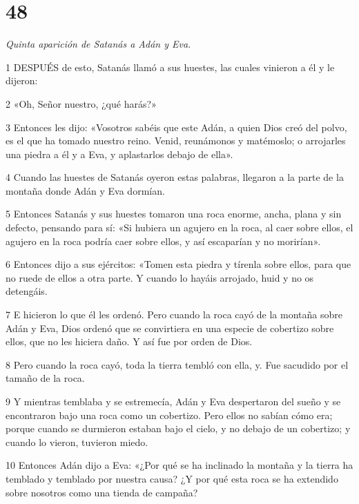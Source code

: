 \chapter{48}

\par \textit{Quinta aparición de Satanás a Adán y Eva.}

\par 1 DESPUÉS de esto, Satanás llamó a sus huestes, las cuales vinieron a él y le dijeron:

\par 2 «Oh, Señor nuestro, ¿qué harás?»

\par 3 Entonces les dijo: «Vosotros sabéis que este Adán, a quien Dios creó del polvo, es el que ha tomado nuestro reino. Venid, reunámonos y matémoslo; o arrojarles una piedra a él y a Eva, y aplastarlos debajo de ella».

\par 4 Cuando las huestes de Satanás oyeron estas palabras, llegaron a la parte de la montaña donde Adán y Eva dormían.

\par 5 Entonces Satanás y sus huestes tomaron una roca enorme, ancha, plana y sin defecto, pensando para sí: «Si hubiera un agujero en la roca, al caer sobre ellos, el agujero en la roca podría caer sobre ellos, y así escaparían y no morirían».

\par 6 Entonces dijo a sus ejércitos: «Tomen esta piedra y tírenla sobre ellos, para que no ruede de ellos a otra parte. Y cuando lo hayáis arrojado, huid y no os detengáis.

\par 7 E hicieron lo que él les ordenó. Pero cuando la roca cayó de la montaña sobre Adán y Eva, Dios ordenó que se convirtiera en una especie de cobertizo sobre ellos, que no les hiciera daño. Y así fue por orden de Dios.

\par 8 Pero cuando la roca cayó, toda la tierra tembló con ella, y. Fue sacudido por el tamaño de la roca.

\par 9 Y mientras temblaba y se estremecía, Adán y Eva despertaron del sueño y se encontraron bajo una roca como un cobertizo. Pero ellos no sabían cómo era; porque cuando se durmieron estaban bajo el cielo, y no debajo de un cobertizo; y cuando lo vieron, tuvieron miedo.

\par 10 Entonces Adán dijo a Eva: «¿Por qué se ha inclinado la montaña y la tierra ha temblado y temblado por nuestra causa? ¿Y por qué esta roca se ha extendido sobre nosotros como una tienda de campaña?

